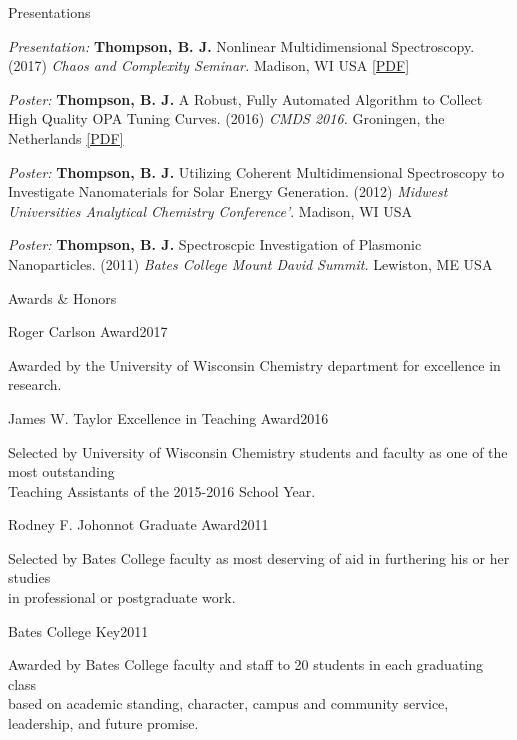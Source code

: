 \documentclass{resume}  %
\begin{document}
\clearpage

\begin{rSection}{Presentations}
  \begin{etaremune}[leftmargin = 1.75 em]
    \item \textit{Presentation:} \textbf{Thompson, B. J.}
      Nonlinear Multidimensional Spectroscopy.
      (2017)
      \textit{Chaos and Complexity Seminar.}
      Madison, WI USA
      \href{https://drive.google.com/open?id=1UWnfb_HsGg7ay7mKl2qscoikOWQsZRNl}{[PDF]}
    \item \textit{Poster:}
      \textbf{Thompson, B. J.}
      A Robust, Fully Automated Algorithm to Collect High Quality OPA Tuning Curves.
      (2016)
      \textit{CMDS 2016.}
      Groningen, the Netherlands
      \href{https://drive.google.com/open?id=1hKj5MW_ms2d92Zj-Q06PTVIVBvIqfN3C}{[PDF]}
    \item \textit{Poster:}
      \textbf{Thompson, B. J.}
      Utilizing Coherent Multidimensional Spectroscopy to Investigate Nanomaterials for Solar
      Energy Generation.
      (2012)
      \textit{Midwest Universities Analytical Chemistry Conference'}.
      Madison, WI USA
    \item \textit{Poster:}
      \textbf{Thompson, B. J.}
      Spectroscpic Investigation of Plasmonic Nanoparticles.
      (2011)
      \textit{Bates College Mount David Summit.}
      Lewiston, ME USA
  \end{etaremune}
\end{rSection}

\begin{rSection}{Awards \& Honors}
  \begin{rSubsection}{Roger Carlson Award}{2017}{}{}
	  \item Awarded by the University of Wisconsin Chemistry department for excellence in research.
  \end{rSubsection}
  \begin{rSubsection}{James W. Taylor Excellence in Teaching Award}{2016}{}{}
    \item  Selected by University of Wisconsin Chemistry students and faculty as one of the most
      outstanding \\ Teaching Assistants of the 2015-2016 School Year.
  \end{rSubsection}
  \begin{rSubsection}{Rodney F. Johonnot Graduate Award}{2011}{}{}
    \item  Selected by Bates College faculty as most deserving of aid in furthering his or her
      studies \\ in professional or postgraduate work.
  \end{rSubsection}
  \begin{rSubsection}{Bates College Key}{2011}{}{}
    \item Awarded by Bates College faculty and staff to 20 students in each graduating class \\
      based on academic standing, character, campus and community service, leadership, and future
      promise.
  \end{rSubsection}
\end{rSection}
\end{document}
